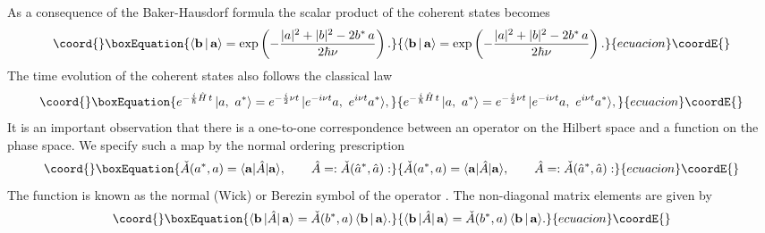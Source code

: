 \documentclass[a4paper,12pt]{article}
\begin{document}
As a consequence of the Baker-Hausdorf formula the scalar
product of the coherent states becomes
\begin{equation}\coord{}\boxEquation{\label{ba}
\langle {\bf b}\,|\,{\bf a}\rangle =\exp\left (-\frac{|a|^2+|b|^2 -2b^*\,a}
{2\hbar\nu} \right).
}{\langle {\bf b}\,|\,{\bf a}\rangle =\exp\left (-\frac{|a|^2+|b|^2 -2b^*\,a}
{2\hbar\nu} \right).
}{ecuacion}\coordE{}\end{equation}
The time evolution of the coherent states also follows the classical law
\begin{equation}\coord{}\boxEquation{\label{cl-law}
e^{-\frac{i}{\hbar}\hat H\,t}\,| a,\,\,a^*\rangle=
e^{-\frac{i}{2}\nu t}\,|e^{-i\nu t} a,
\,\,e^{i\nu t}a^* \rangle,
}{e^{-\frac{i}{\hbar}\hat H\,t}\,| a,\,\,a^*\rangle=
e^{-\frac{i}{2}\nu t}\,|e^{-i\nu t} a,
\,\,e^{i\nu t}a^* \rangle,
}{ecuacion}\coordE{}\end{equation}
It is an important observation that there is a one-to-one correspondence
between an operator  \coordHE{} on the Hilbert space and a
function \coordHE{} on the phase space.
We specify such a map by the normal ordering prescription
\begin{equation}\coord{}\boxEquation{\label{symb}
\check A(a^*,a)=\langle {\bf a} |\hat A|{\bf a}\rangle,~~~~~~
\hat A =:\check A(\hat a^*,\hat a):
}{\check A(a^*,a)=\langle {\bf a} |\hat A|{\bf a}\rangle,~~~~~~
\hat A =:\check A(\hat a^*,\hat a):
}{ecuacion}\coordE{}\end{equation}
The function \coordHE{} is known as the normal (Wick)
or Berezin symbol of the operator \coordHE{} \cite{Berezin}.
The non-diagonal matrix elements are given by
\begin{equation}\coord{}\boxEquation{\label{bAa}
\langle {\bf b}\,|\hat A|\,{\bf a}\rangle = \check A(b^*,a)
\,\langle {\bf b}\,|\,{\bf a}\rangle .
}{\langle {\bf b}\,|\hat A|\,{\bf a}\rangle = \check A(b^*,a)
\,\langle {\bf b}\,|\,{\bf a}\rangle .
}{ecuacion}\coordE{}\end{equation}
\end{document}
